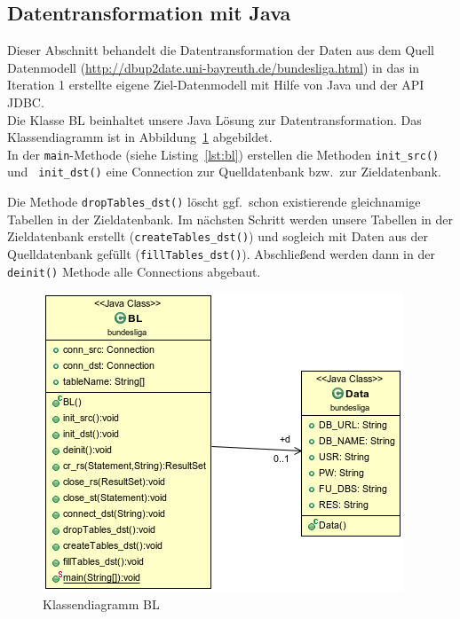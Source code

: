 \documentclass[
10pt,
a4paper
]{scrartcl}
\begin{document}
\subsection{Datentransformation mit Java}

Dieser Abschnitt behandelt die Datentransformation der Daten aus dem Quell Datenmodell (\url{http://dbup2date.uni-bayreuth.de/bundesliga.html}) in das in Iteration 1 erstellte eigene Ziel-Datenmodell mit Hilfe von Java und der API JDBC.\\

Die Klasse BL beinhaltet unsere Java L\"{o}sung zur Datentransformation. Das Klassendiagramm ist in Abbildung~\ref{fig:BL} abgebildet.\\

In der  \texttt{main}-Methode (siehe Listing~\ref{lst:bl}) erstellen die Methoden  \texttt{init\_src()} und \texttt{ init\_dst()} eine Connection zur Quelldatenbank bzw.~zur Zieldatenbank.



Die Methode \texttt{dropTables\_dst()} l\"{o}scht ggf.~schon existierende gleichnamige Tabellen in der Zieldatenbank. Im n\"{a}chsten Schritt werden unsere Tabellen in der Zieldatenbank erstellt (\texttt{createTables\_dst()}) und sogleich mit Daten aus der Quelldatenbank gef\"{u}llt (\texttt{fillTables\_dst()}). Abschlie{\ss}end werden dann in der  \texttt{deinit()} Methode alle Connections abgebaut.

\begin{figure}[H]
\centering
\includegraphics[scale=0.7]{BL.png}
\caption{Klassendiagramm BL}
\label{fig:BL}
\end{figure}
\end{document}
